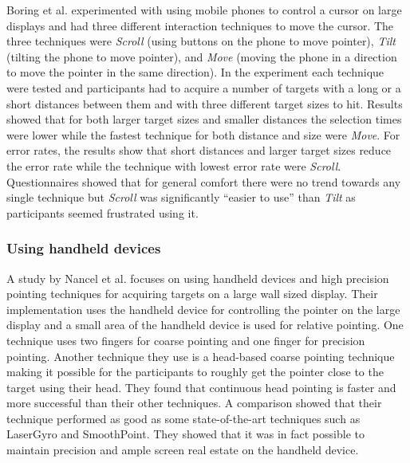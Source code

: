 Boring et al. experimented with using mobile phones to control a cursor on large displays and had three different interaction techniques to move the cursor.
The three techniques were \emph{Scroll} (using buttons on the phone to move pointer), \emph{Tilt} (tilting the phone to move pointer), and \emph{Move} (moving the phone in a direction to move the pointer in the same direction).
In the experiment each technique were tested and participants had to acquire a number of targets with a long or a short distances between them and with three different target sizes to hit.
Results showed that for both larger target sizes and smaller distances the selection times were lower while the fastest technique for both distance and size were \emph{Move}.
For error rates, the results show that short distances and larger target sizes reduce the error rate while the technique with lowest error rate were \emph{Scroll}.
Questionnaires showed that for general comfort there were no trend towards any single technique but \emph{Scroll} was significantly ``easier to use'' than \emph{Tilt} as participants seemed frustrated using it.

\subsubsection{Using handheld devices} \label{sec:midAirPointingHandheld}
A study by Nancel et al. \cite{Nancel:2013} focuses on using handheld devices and high precision pointing techniques for acquiring targets on a large wall sized display.
Their implementation uses the handheld device for controlling the pointer on the large display and a small area of the handheld device is used for relative pointing.
One technique uses two fingers for coarse pointing and one finger for precision pointing. 
Another technique they use is a head-based coarse pointing technique making it possible for the participants to roughly get the pointer close to the target using their head.
They found that continuous head pointing is faster and more successful than their other techniques.
A comparison showed that their technique performed as good as some state-of-the-art techniques such as LaserGyro\cite{Vogel:2005} and SmoothPoint\cite{Gallo:2012}. 
They showed that it was in fact possible to maintain precision and ample screen real estate on the handheld device.

